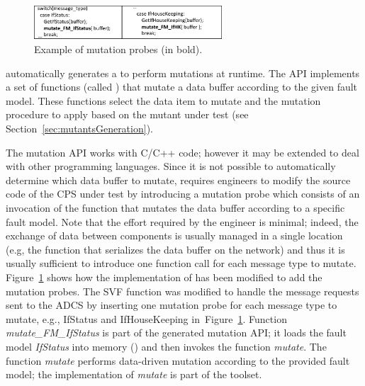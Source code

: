 \begin{figure}[tb]
\centering
\includegraphics[width=7cm]{damat/images/ProbesExample}
\caption{Example of \APPR mutation probes (in bold).}
\label{fig:appr:ProbesExample}
\end{figure}

\APPR automatically generates a  to perform mutations at runtime. The API implements a set of functions (called ) that mutate a data buffer according to the given fault model. 
These functions select the data item to mutate and the mutation procedure to apply based on the mutant under test (see Section~\ref{sec:mutantsGeneration}). 

The \APPR mutation API works with C/C++ code; however it may be extended to deal with other programming languages.
Since it is not possible to automatically determine which data buffer to mutate, \APPR requires engineers to modify the source code of the CPS under test by introducing a mutation probe which consists of an invocation of the \APPR function that mutates the data buffer according to a specific fault model.
Note that the effort required by the engineer is minimal; indeed, the exchange of data between components is usually managed in a single location (e.g, the function that serializes the data buffer on the network) and thus it is usually sufficient to introduce one function call for each message type to mutate.
Figure~\ref{fig:appr:ProbesExample} shows how the implementation of \ESAIL has been modified to add the mutation probes. 
The SVF function was modified to handle the message requests sent to the ADCS by inserting one mutation probe for each message type to mutate, e.g., IfStatus and IfHouseKeeping in~Figure~\ref{fig:appr:ProbesExample}. 
Function \emph{mutate\_FM\_IfStatus} is part of the generated mutation API; it loads the fault model \emph{IfStatus} into memory () and then invokes the function \emph{mutate}. The function \emph{mutate} performs data-driven mutation according to the provided fault model; the implementation of \emph{mutate} is part of the \APPR toolset.





